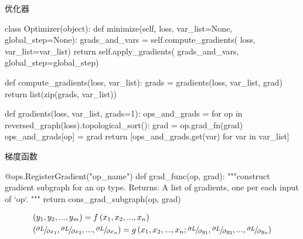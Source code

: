 \begin{frame}[fragile]{优化器}
  \begin{python} 
class Optimizer(object):
  def minimize(self, loss, var_list=None, global_step=None):
    grads_and_vars = self.compute_gradients(
      loss, var_list=var_list)
    return self.apply_gradients(
      grads_and_vars, 
      global_step=global_step)

  def compute_gradients(loss, var_list):
    grads = gradients(loss, var_list, grad)
    return list(zip(grads, var_list))

  def gradients(loss, var_list, grads=1):
    ops_and_grads = {}
    for op in reversed_graph(loss).topological_sort():
      grad = op.grad_fn(grad)
      ops_and_grads[op] = grad
    return [ops_and_grads.get(var) for var in var_list]
  \end{python}
\end{frame}

\begin{frame}[fragile]{梯度函数}
  \begin{python}
@ops.RegisterGradient("op_name")
def grad_func(op, grad):
  """construct gradient subgraph for an op type.
  Returns:
    A list of gradients, one per each input of `op`.
  """
  return cons_grad_subgraph(op, grad) 
  \end{python}

\[\begin{gathered}
  \left( {{y_1},{y_2},...,{y_m}} \right) = f\left( {{x_1},{x_2},...,{x_n}} \right) \hfill \\
  \left( {{\raise0.5ex\hbox{$\scriptstyle {\partial L}$}
\kern-0.1em/\kern-0.15em
\lower0.25ex\hbox{$\scriptstyle {\partial {x_1}}$}},{\raise0.5ex\hbox{$\scriptstyle {\partial L}$}
\kern-0.1em/\kern-0.15em
\lower0.25ex\hbox{$\scriptstyle {\partial {x_2}}$}},...,{\raise0.5ex\hbox{$\scriptstyle {\partial L}$}
\kern-0.1em/\kern-0.15em
\lower0.25ex\hbox{$\scriptstyle {\partial {x_n}}$}}} \right) = g\left( {{x_1},{x_2},...,{x_n};{\raise0.5ex\hbox{$\scriptstyle {\partial L}$}
\kern-0.1em/\kern-0.15em
\lower0.25ex\hbox{$\scriptstyle {\partial {y_1}}$}},{\raise0.5ex\hbox{$\scriptstyle {\partial L}$}
\kern-0.1em/\kern-0.15em
\lower0.25ex\hbox{$\scriptstyle {\partial {y_2}}$}},...,{\raise0.5ex\hbox{$\scriptstyle {\partial L}$}
\kern-0.1em/\kern-0.15em
\lower0.25ex\hbox{$\scriptstyle {\partial {y_n}}$}}} \right) \hfill \\ 
\end{gathered} \]
\end{frame}


